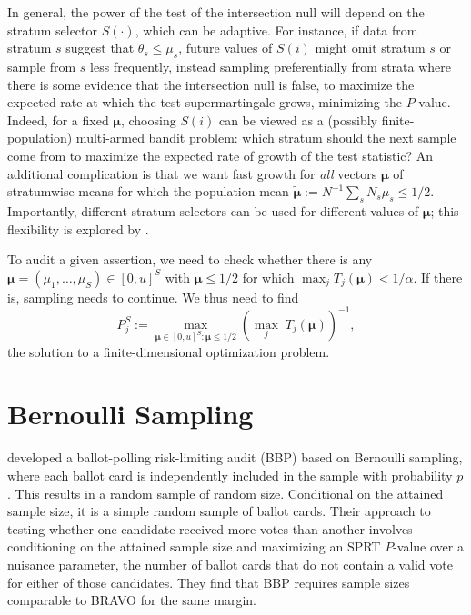 \documentclass[aoas]{imsart}
\begin{document}
In general, the power of the test of the intersection null will depend on the stratum selector $S(\cdot)$,
which can be adaptive.
For instance, if data from stratum $s$ suggest that $\theta_s \le \mu_s$, future values of $S(i)$ might omit stratum $s$
or sample from $s$ less frequently,
instead sampling preferentially from strata where there is some evidence that the intersection null is false, to maximize the
expected rate at which the test supermartingale grows, minimizing the $P$-value.
Indeed, for a fixed $\boldsymbol{\mu}$, choosing $S(i)$ can be viewed as a (possibly finite-population) multi-armed bandit problem:
which stratum should the next sample come from to maximize the expected rate of growth of the 
test statistic?
An additional complication is that we want fast growth for \emph{all} vectors $\boldsymbol{\mu}$ of stratumwise
means for which the population mean $\tilde{\boldsymbol{\mu}} := N^{-1}\sum_s N_s \mu_s \le 1/2$.
Importantly, different stratum selectors can be used for different values of $\boldsymbol{\mu}$;
this flexibility is explored by \citet{spertusStark22}.

To audit a given assertion, we need to check whether there is any $\boldsymbol{\mu} = (\mu_1, \ldots, \mu_S) \in [0, u]^S$ with 
$\tilde{\boldsymbol{\mu}}  \le 1/2$ for which
$\max_j T_j(\boldsymbol{\mu}) < 1/\alpha$.
If there is, sampling needs to continue.
We thus need to find
\begin{equation} \label{eq:strat-max}
  P_j^S := \max_{\boldsymbol{\mu} \in [0, u]^S: \tilde{\boldsymbol{\mu}} \le 1/2} (\max_j \; T_j(\boldsymbol{\mu}))^{-1},
\end{equation}
the solution to a finite-dimensional optimization problem.

\section{Bernoulli Sampling} \label{sec:bernoulli}

\citet{ottoboniEtal20} developed a ballot-polling risk-limiting audit (BBP) based on Bernoulli sampling, where each
ballot card is independently included in the sample with probability $p$.
This results in a random sample of random size.
Conditional on the attained sample size, it is a simple random sample of ballot cards.
Their approach to testing whether one candidate received more votes than another 
involves conditioning on the attained sample size and maximizing an SPRT $P$-value over
a nuisance parameter, the number of ballot cards that do not contain a valid vote for either of those candidates.
They find that BBP requires sample sizes comparable to BRAVO for the same margin.
\end{document}
